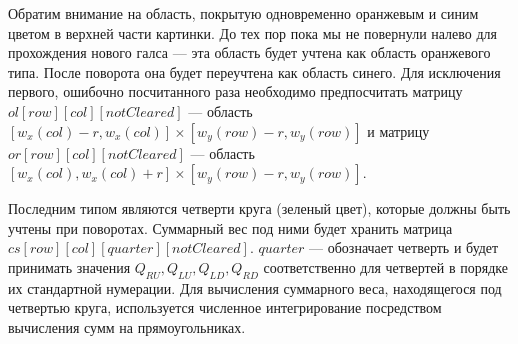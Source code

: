Обратим внимание на область, покрытую одновременно оранжевым и синим цветом в верхней части картинки.
До тех пор пока мы не повернули налево для прохождения нового галса --- эта область будет
учтена как область оранжевого типа. После поворота она будет переучтена как область синего.
Для исключения первого, ошибочно посчитанного раза необходимо предпосчитать
матрицу $ol[row][col][notCleared]$ --- область $[w_x(col)-r, w_x(col)] \times [w_y(row)-r, w_y(row)]$
и матрицу $or[row][col][notCleared]$ --- область $[w_x(col),w_x(col)+r]\times [w_y(row)-r, w_y(row)]$.

Последним типом являются четверти круга (зеленый цвет), которые должны быть учтены при поворотах.
Суммарный вес под ними будет хранить матрица $cs[row][col][quarter][notCleared]$.
$quarter$ --- обозначает четверть и будет принимать значения $Q_{RU}, Q_{LU}, Q_{LD}, Q_{RD}$
соответственно для четвертей в порядке их стандартной нумерации. Для вычисления суммарного
веса, находящегося под четвертью круга, используется численное интегрирование посредством
вычисления сумм на прямоугольниках.
\FloatBarrier
